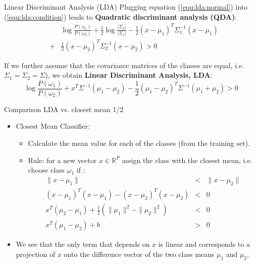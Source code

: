 \documentclass[xcolor=pdftex,dvipsnames,table]{beamer}
\begin{document}
\begin{frame}{Linear Discriminant Analysis (LDA)}
Plugging equation (\ref{equ:lda:normal}) into (\ref{equ:lda:condition}) leads to {\bf Quadratic discriminant analysis (QDA)}: 
\begin{eqnarray*}
&& \log{\frac{P(\omega_1)}{P(\omega_2)}} + 
\frac{1}{2}\log{\frac{|\Sigma_2|}{|\Sigma_1|}}
- \frac{1}{2}(x-\mu_1)^T\Sigma_1^{-1}(x-\mu_1) \nonumber \\
&+& \frac{1}{2}(x-\mu_2)^T\Sigma_2^{-1}(x-\mu_2) > 0
\end{eqnarray*}


If we further assume that the covariance matrices of the classes are equal, i.e. $\Sigma_1 = \Sigma_2 = \Sigma$), we obtain {\bf Linear Discriminant Analysis, LDA}:
\begin{equation*}
\log{\frac{P(\omega_1)}{P(\omega_2)}} + x^T\Sigma^{-1}(\mu_1-\mu_2) - \frac{1}{2}(\mu_1-\mu_2)^T\Sigma^{-1}(\mu_1+\mu_2) > 0
\end{equation*}
\end{frame}

\begin{frame}{Comparison LDA vs. closest mean 1/2}
\begin{itemize}
	\item Closest Mean Classifier: 
	\begin{itemize}
		\item Calculate the mean value for each of the classes (from the training set).
		\item Rule: for a new vector $x \in \mathbb{R}^P$ assign the class with the closest mean, i.e. choose class $\omega_1$ if :
		\begin{eqnarray*}
		\|x - \mu_1\| &<& \|x - \mu_2\| \\
		(x-\mu_1)^T(x-\mu_1) - (x-\mu_2)^T(x-\mu_2) &<& 0 \\
		x^T(\mu_2 - \mu_1) + \frac{1}{2}(\|\mu_1\|^2 - \|\mu_2\|^2) &<& 0 \\
		x^T(\mu_1 - \mu_2) + b &>& 0
		\end{eqnarray*}
	\end{itemize}
	\item We see that the only term that depends on $x$ is linear and corresponds to a projection of $x$ onto the difference vector of the two class means $\mu_1$ and $\mu_2$. 
\end{itemize}
\end{frame}
\end{document}
